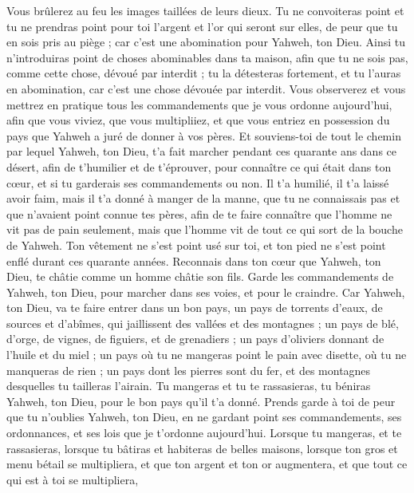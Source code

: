 \begin{multicols}{2}
Vous brûlerez au feu les images taillées de leurs dieux. Tu ne convoiteras point et tu ne prendras point pour toi l'argent et l'or qui seront sur elles, de peur que tu en sois pris au piège ; car c'est une abomination pour Yahweh, ton Dieu.
Ainsi tu n'introduiras point de choses abominables dans ta maison, afin que tu ne sois pas, comme cette chose, dévoué par interdit ; tu la détesteras fortement, et tu l'auras en abomination, car c'est une chose dévouée par interdit.
\VerseOne{}Vous observerez et vous mettrez en pratique tous les commandements que je vous ordonne aujourd'hui, afin que vous viviez, que vous multipliiez, et que vous entriez en possession du pays que Yahweh a juré de donner à vos pères.
Et souviens-toi de tout le chemin par lequel Yahweh, ton Dieu, t'a fait marcher pendant ces quarante ans dans ce désert, afin de t'humilier et de t'éprouver, pour connaître ce qui était dans ton cœur, et si tu garderais ses commandements ou non.
Il t'a humilié, il t'a laissé avoir faim, mais il t'a donné à manger de la manne, que tu ne connaissais pas et que n'avaient point connue tes pères, afin de te faire connaître que l'homme ne vit pas de pain seulement, mais que l'homme vit de tout ce qui sort de la bouche de Yahweh.
Ton vêtement ne s'est point usé sur toi, et ton pied ne s'est point enflé durant ces quarante années.
Reconnais dans ton cœur que Yahweh, ton Dieu, te châtie comme un homme châtie son fils.
Garde les commandements de Yahweh, ton Dieu, pour marcher dans ses voies, et pour le craindre.
Car Yahweh, ton Dieu, va te faire entrer dans un bon pays, un pays de torrents d'eaux, de sources et d'abîmes, qui jaillissent des vallées et des montagnes ;
un pays de blé, d'orge, de vignes, de figuiers, et de grenadiers ; un pays d'oliviers donnant de l'huile et du miel ;
un pays où tu ne mangeras point le pain avec disette, où tu ne manqueras de rien ; un pays dont les pierres sont du fer, et des montagnes desquelles tu tailleras l'airain.
Tu mangeras et tu te rassasieras, tu béniras Yahweh, ton Dieu, pour le bon pays qu'il t'a donné.
Prends garde à toi de peur que tu n'oublies Yahweh, ton Dieu, en ne gardant point ses commandements, ses ordonnances, et ses lois que je t'ordonne aujourd'hui.
Lorsque tu mangeras, et te rassasieras, lorsque tu bâtiras et habiteras de belles maisons,
lorsque ton gros et menu bétail se multipliera, et que ton argent et ton or augmentera, et que tout ce qui est à toi se multipliera,

\end{multicols}
